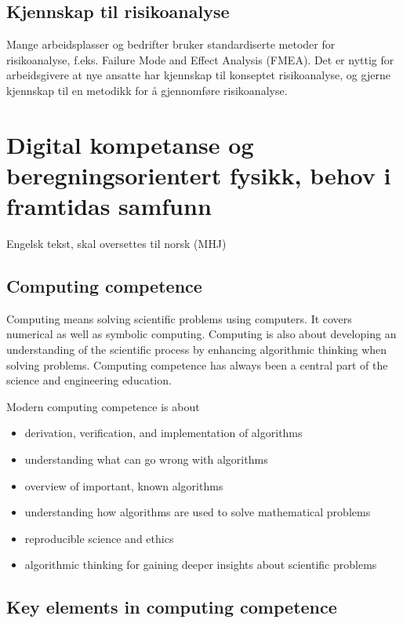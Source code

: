 \documentclass{article}
\begin{document}
\subsection{Kjennskap til risikoanalyse}
Mange arbeidsplasser og bedrifter bruker standardiserte metoder for risikoanalyse, f.eks. Failure Mode and Effect Analysis (FMEA). Det er nyttig for arbeidsgivere at nye ansatte har kjennskap til konseptet risikoanalyse, og gjerne kjennskap til en metodikk for å gjennomføre risikoanalyse.

\section{Digital kompetanse og beregningsorientert fysikk, behov i framtidas samfunn}
Engelsk tekst, skal oversettes til norsk (MHJ)
\subsection{Computing competence}

Computing means solving scientific problems using computers. It covers
numerical as well as symbolic computing. Computing is also about
developing an understanding of the scientific process by enhancing
algorithmic thinking when solving problems.  Computing competence has
always been a central part of the science and engineering
education.

Modern computing competence is about

\begin{itemize}
\item derivation, verification, and implementation of algorithms

\item understanding what can go wrong with algorithms

\item overview of important, known algorithms

\item understanding how algorithms are used to solve mathematical problems

\item reproducible science and ethics

\item algorithmic thinking for gaining deeper insights about scientific problems
\end{itemize}

\noindent
\subsection{Key elements in computing competence}
\end{document}
